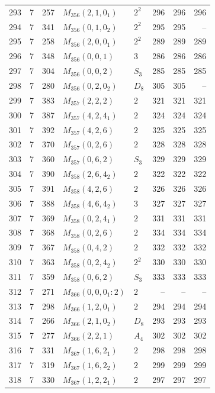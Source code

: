 \documentclass[11pt,a4paper]{article}
\begin{document}
\begin{longtable}{rrr|l|l|rrr}
293 & 7 & 257 & $M_{356}(2,1,0_1)$ & $2^2$ & 296 & 296 & 296\\
294 & 7 & 341 & $M_{356}(0,1,0_2)$ & $2^2$ & 295 & 295 & --\\
295 & 7 & 258 & $M_{356}(2,0,0_1)$ & $2^2$ & 289 & 289 & 289\\
296 & 7 & 348 & $M_{356}(0,0,1)$ & $3$ & 286 & 286 & 286\\
297 & 7 & 304 & $M_{356}(0,0,2)$ & $S_3$ & 285 & 285 & 285\\
298 & 7 & 280 & $M_{356}(0,2,0_2)$ & $D_8$ & 305 & 305 & --\\
299 & 7 & 383 & $M_{357}(2,2,2)$ & $2$ & 321 & 321 & 321\\
300 & 7 & 387 & $M_{357}(4,2,4_1)$ & $2$ & 324 & 324 & 324\\
301 & 7 & 392 & $M_{357}(4,2,6)$ & $2$ & 325 & 325 & 325\\
302 & 7 & 370 & $M_{357}(0,2,6)$ & $2$ & 328 & 328 & 328\\
303 & 7 & 360 & $M_{357}(0,6,2)$ & $S_3$ & 329 & 329 & 329\\
304 & 7 & 390 & $M_{358}(2,6,4_2)$ & $2$ & 322 & 322 & 322\\
305 & 7 & 391 & $M_{358}(4,2,6)$ & $2$ & 326 & 326 & 326\\
306 & 7 & 388 & $M_{358}(4,6,4_2)$ & $3$ & 327 & 327 & 327\\
307 & 7 & 369 & $M_{358}(0,2,4_1)$ & $2$ & 331 & 331 & 331\\
308 & 7 & 368 & $M_{358}(0,2,6)$ & $2$ & 334 & 334 & 334\\
309 & 7 & 367 & $M_{358}(0,4,2)$ & $2$ & 332 & 332 & 332\\
310 & 7 & 363 & $M_{358}(0,2,4_2)$ & $2^2$ & 330 & 330 & 330\\
311 & 7 & 359 & $M_{358}(0,6,2)$ & $S_3$ & 333 & 333 & 333\\
312 & 7 & 271 & $M_{366}(0,0,0_1:2)$ & $2$ & -- & -- & --\\
313 & 7 & 298 & $M_{366}(1,2,0_1)$ & $2$ & 294 & 294 & 294\\
314 & 7 & 266 & $M_{366}(2,1,0_2)$ & $D_8$ & 293 & 293 & 293\\
315 & 7 & 277 & $M_{366}(2,2,1)$ & $A_4$ & 302 & 302 & 302\\
316 & 7 & 331 & $M_{367}(1,6,2_1)$ & $2$ & 298 & 298 & 298\\
317 & 7 & 319 & $M_{367}(1,6,2_2)$ & $2$ & 299 & 299 & 299\\
318 & 7 & 330 & $M_{367}(1,2,2_1)$ & $2$ & 297 & 297 & 297\\

\end{longtable}
\end{document}
